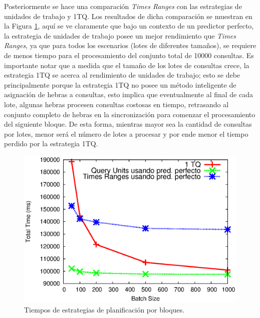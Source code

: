 Posteriormente se hace una comparación \textit{Times Ranges} con las estrategias de unidades de trabajo y 1TQ. Los resultados de dicha comparación se muestran en la Figura \ref{fig:units_vs_multithread}, aquí se ve claramente que bajo un contexto de un predictor perfecto, la estrategia de unidades de trabajo posee un mejor rendimiento que \textit{Times Ranges}, ya que para todos los escenarios (lotes de diferentes tamaños), se requiere de menos tiempo para el procesamiento del conjunto total de 10000 consultas.
Es importante notar que a medida que el tamaño de los lotes de consultas crece, la estrategia 1TQ se acerca al rendimiento de unidades de trabajo; esto se debe principalmente porque la estrategia 1TQ no posee un método inteligente de asignación de hebras a consultas, esto implica que eventualmente al final de cada lote, algunas hebras procesen consultas costosas en tiempo, retrasando al conjunto completo de hebras en la sincronización para comenzar el procesamiento del siguiente bloque. De esta forma, mientras mayor sea la cantidad de consultas por lotes, menor será el número de lotes a procesar y por ende menor el tiempo perdido por la estrategia 1TQ.  

\begin{figure}[!ht]
\centering
\includegraphics[scale=.75]{images/units_vs_multithread.eps}
\caption{Tiempos de estrategias de planificación por bloques.}
\label{fig:units_vs_multithread}
\end{figure}

